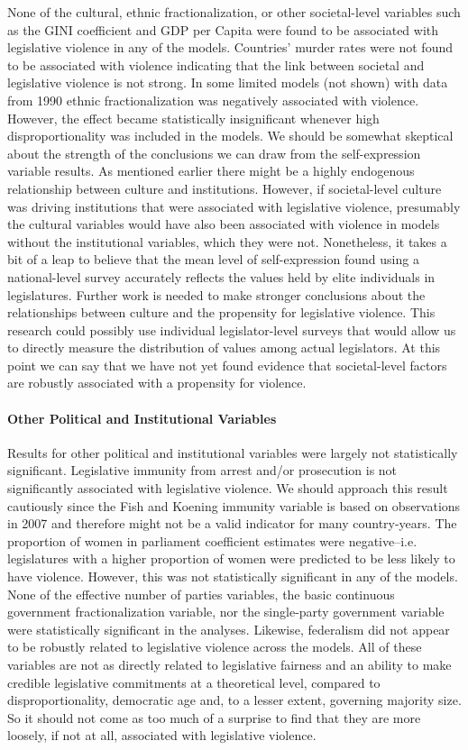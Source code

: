 \documentclass[a4paper]{article}\usepackage[]{graphicx}\usepackage[]{color}
\begin{document}
None of the cultural, ethnic fractionalization, or other societal-level variables such as the GINI coefficient and GDP per Capita were found to be associated with legislative violence in any of the models. Countries' murder rates were not found to be associated with violence indicating that the link between societal and legislative violence is not strong. In some limited models (not shown) with data from 1990 ethnic fractionalization was negatively associated with violence. However, the effect became statistically insignificant whenever high disproportionality was included in the models. We should be somewhat skeptical about the strength of the conclusions we can draw from the self-expression variable results. As mentioned earlier there might be a highly endogenous relationship between culture and institutions. However, if societal-level culture was driving institutions that were associated with legislative violence, presumably the cultural variables would have also been associated with violence in models without the institutional variables, which they were not. Nonetheless, it takes a bit of a leap to believe that the mean level of self-expression found using a national-level survey accurately reflects the values held by elite individuals in legislatures. Further work is needed to make stronger conclusions about the relationships between culture and the propensity for legislative violence. This research could possibly use individual legislator-level surveys that would allow us to directly measure the distribution of values among actual legislators. At this point we can say that we have not yet found evidence that societal-level factors are robustly associated with a propensity for violence.

\paragraph{Other Political and Institutional Variables}

Results for other political and institutional variables were largely not statistically significant. Legislative immunity from arrest and/or prosecution is not significantly associated with legislative violence. We should approach this result cautiously since the Fish and Koening immunity variable is based on observations in 2007 and therefore might not be a valid indicator for many country-years. The proportion of women in parliament coefficient estimates were negative--i.e. legislatures with a higher proportion of women were predicted to be less likely to have violence. However, this was not statistically significant in any of the models. None of the effective number of parties variables, the basic continuous government fractionalization variable, nor the single-party government variable were statistically significant in the analyses. Likewise, federalism did not appear to be robustly related to legislative violence across the models. All of these variables are not as directly related to legislative fairness and an ability to make credible legislative commitments at a theoretical level, compared to disproportionality, democratic age and, to a lesser extent, governing majority size. So it should not come as too much of a surprise to find that they are more loosely, if not at all, associated with legislative violence.
\end{document}
